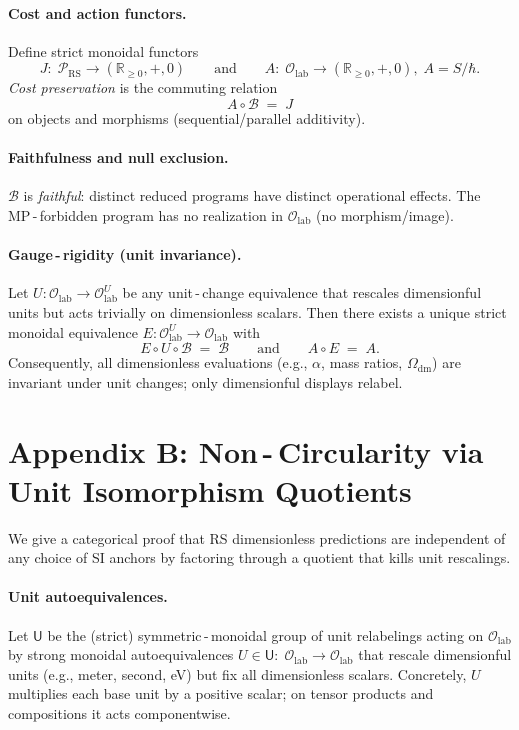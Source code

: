 \documentclass[11pt]{article}
\newcommand{\RR}{\mathbb{R}}
\theoremstyle{remark}
\begin{document}
\paragraph{Cost and action functors.}
Define strict monoidal functors
\[
  J:\; \mathcal P_{\mathrm{RS}}\to (\RR_{\ge0},+,0)
  \qquad\text{and}\qquad
  A:\; \mathcal O_{\mathrm{lab}}\to (\RR_{\ge0},+,0), \; A= S/\hbar.
\]
\emph{Cost preservation} is the commuting relation
\[
  \boxed{\;A\circ \mathcal B \;=\; J\;}
\]
on objects and morphisms (sequential/parallel additivity).

\paragraph{Faithfulness and null exclusion.}
$\mathcal B$ is \emph{faithful}: distinct reduced programs have distinct operational effects.
The MP\,\mbox{-}\,forbidden program has no realization in $\mathcal O_{\mathrm{lab}}$ (no morphism/image).

\paragraph{Gauge\,\mbox{-}\,rigidity (unit invariance).}
Let $U: \mathcal O_{\mathrm{lab}}\to \mathcal O_{\mathrm{lab}}^{U}$ be any unit\,\mbox{-}\,change equivalence that rescales
dimensionful units but acts trivially on dimensionless scalars. Then there exists a
unique strict monoidal equivalence $E: \mathcal O_{\mathrm{lab}}^{U}\to \mathcal O_{\mathrm{lab}}$ with
\[
   E\circ U\circ \mathcal B\;=\; \mathcal B \qquad\text{and}\qquad A\circ E\;=\;A.
\]
Consequently, all dimensionless evaluations (e.g., $\alpha$, mass ratios, $\Omega_{\mathrm{dm}}$) are
invariant under unit changes; only dimensionful displays relabel.

\bigskip
\section*{Appendix B: Non\,\mbox{-}\,Circularity via Unit Isomorphism Quotients}
We give a categorical proof that RS dimensionless predictions are independent of any
choice of SI anchors by factoring through a quotient that kills unit rescalings.

\paragraph{Unit autoequivalences.}
Let $\mathsf U$ be the (strict) symmetric\,\mbox{-}\,monoidal group of unit relabelings acting on
$\mathcal O_{\mathrm{lab}}$ by strong monoidal autoequivalences
$U \in \mathsf U:\; \mathcal O_{\mathrm{lab}} \to \mathcal O_{\mathrm{lab}}$ that rescale
dimensionful units (e.g., meter, second, eV) but fix all dimensionless scalars.
Concretely, $U$ multiplies each base unit by a positive scalar; on tensor products and
compositions it acts componentwise.
\end{document}
